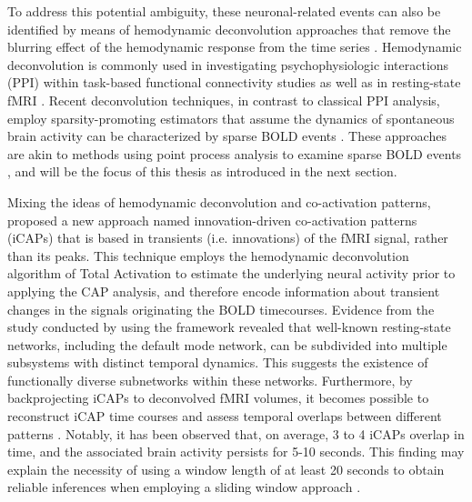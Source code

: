 To address this potential ambiguity, these neuronal-related events can also be
identified by means of hemodynamic deconvolution approaches that remove the
blurring effect of the hemodynamic response from the time series
\citep{Gaudes2013Paradigmfreemapping,Karahanoglu2013TotalactivationfMRI,Petridou2013PeriodsrestfMRI}.
Hemodynamic deconvolution is commonly used in investigating psychophysiologic
interactions (PPI) within task-based functional connectivity studies
\citep{Gerchen2014Analyzingtaskdependent,Gitelman2003Modelingregionalpsychophysiologic}
as well as in resting-state fMRI \citep{Di2015Characterizationsrestingstate}.
Recent deconvolution techniques, in contrast to classical PPI
analysis, employ sparsity-promoting estimators that assume the dynamics of
spontaneous brain activity can be characterized by sparse BOLD events
\citep{Gaudes2013Paradigmfreemapping,Karahanoglu2013TotalactivationfMRI,Petridou2013PeriodsrestfMRI,Urunuela2023HemodynamicDeconvolutionDemystified}.
These approaches are akin to methods using point process analysis to examine
sparse BOLD events \citep{Tagliazucchi2012Criticalitylargescale}, and will be
the focus of this thesis as introduced in the next section.

Mixing the ideas of hemodynamic deconvolution and co-activation patterns,
\cite{Karahanoglu2015Transientbrainactivity} proposed a new approach named
innovation-driven co-activation patterns (iCAPs) that is based in transients
(i.e. innovations) of the fMRI signal, rather than its peaks. This technique
employs the hemodynamic deconvolution algorithm of Total Activation
\citep{Karahanoglu2013TotalactivationfMRI} to estimate the underlying neural
activity prior to applying the CAP analysis, and therefore encode information
about transient changes in the signals originating the BOLD timecourses.
Evidence from the study conducted by
\cite{Karahanoglu2015Transientbrainactivity} using the framework revealed that
well-known resting-state networks, including the default mode network, can be
subdivided into multiple subsystems with distinct temporal dynamics. This
suggests the existence of functionally diverse subnetworks within these
networks. Furthermore, by backprojecting iCAPs to deconvolved fMRI
volumes, it becomes possible to reconstruct iCAP time courses and assess
temporal overlaps between different patterns
\citep{Zoller2019RobustRecoveryTemporal}. Notably, it has been observed that, on
average, 3 to 4 iCAPs overlap in time, and the associated brain activity
persists for 5-10 seconds. This finding may explain the necessity of using a
window length of at least 20 seconds to obtain reliable inferences when
employing a sliding window approach
\citep{Karahanoglu2015Transientbrainactivity,Preti2017dynamicfunctionalconnectome}.

